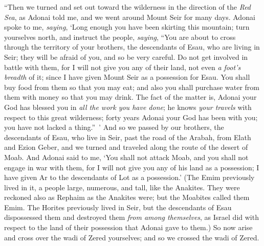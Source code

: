 \begin{biblechapter} %
\verse “Then we turned and set out toward the wilderness in the direction of the \textit{Red Sea}, as Adonai told me, and we went around Mount Seir for many days.
\verse Adonai spoke to me, \textit{saying},
\verse ‘Long enough you have been skirting this mountain; turn yourselves north,
\verse and instruct the people, \textit{saying}, “You are about to cross through the territory of your brothers, the descendants of Esau, who are living in Seir; they will be afraid of you, and so be very careful.
\verse Do not get involved in battle with them, for I will not give you any of their land, not even \textit{a foot’s breadth} of it; since I have given Mount Seir as a possession for Esau.
\verse You shall buy food from them so that you may eat; and also you shall purchase water from them with money so that you may drink.
\verse The fact of the matter is, Adonai your God has blessed you in \textit{all the work you have done}; he knows \textit{your travels} with respect to this great wilderness; forty years Adonai your God has been with you; you have not lacked a thing.” ’
\verse And so we passed by our brothers, the descendants of Esau, who live in Seir, past the road of the Arabah, from Elath and Ezion Geber, and we turned and traveled along the route of the desert of Moab.
\verse And Adonai said to me, ‘You shall not attack Moab, and you shall not engage in war with them, for I will not give you any of his land as a possession; I have given Ar to the descendants of Lot as a possession.’
\verse (The Emim previously lived in it, a people large, numerous, and tall, like the Anakites.
\verse They were reckoned also as Rephaim as the Anakites were; but the Moabites called them Emim.
\verse The Horites previously lived in Seir, but the descendants of Esau dispossessed them and destroyed them \textit{from among themselves}, as Israel did with respect to the land of their possession that Adonai gave to them.)
\verse So now arise and cross over the wadi of Zered yourselves; and so we crossed the wadi of Zered.

\end{biblechapter}
